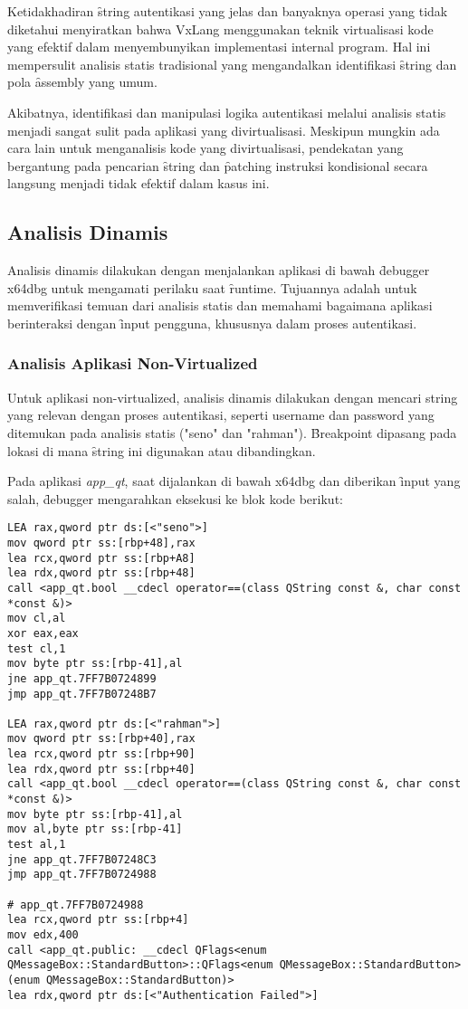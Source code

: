 Ketidakhadiran \f{string} autentikasi yang jelas dan banyaknya operasi yang tidak diketahui menyiratkan bahwa VxLang menggunakan teknik virtualisasi kode yang efektif dalam menyembunyikan implementasi internal program. Hal ini mempersulit analisis statis tradisional yang mengandalkan identifikasi \f{string} dan pola \f{assembly} yang umum.

Akibatnya, identifikasi dan manipulasi logika autentikasi melalui analisis statis menjadi sangat sulit pada aplikasi yang divirtualisasi. Meskipun mungkin ada cara lain untuk menganalisis kode yang divirtualisasi, pendekatan yang bergantung pada pencarian \f{string} dan \f{patching} instruksi kondisional secara langsung menjadi tidak efektif dalam kasus ini.

\subsection{Analisis Dinamis}
Analisis dinamis dilakukan dengan menjalankan aplikasi di bawah \f{debugger} x64dbg untuk mengamati perilaku saat \f{runtime}. Tujuannya adalah untuk memverifikasi temuan dari analisis statis dan memahami bagaimana aplikasi berinteraksi dengan \f{input} pengguna, khususnya dalam proses autentikasi.

\subsubsection{Analisis Aplikasi Non-Virtualized}

Untuk aplikasi non-virtualized, analisis dinamis dilakukan dengan mencari string yang relevan dengan proses autentikasi, seperti username dan password yang ditemukan pada analisis statis ("seno" dan "rahman"). \f{Breakpoint} dipasang pada lokasi di mana \f{string} ini digunakan atau dibandingkan.

Pada aplikasi \textit{app\_qt}, saat dijalankan di bawah x64dbg dan diberikan \f{input} yang salah, \f{debugger} mengarahkan eksekusi ke blok kode berikut:

\begin{verbatim}
LEA rax,qword ptr ds:[<"seno">]
mov qword ptr ss:[rbp+48],rax
lea rcx,qword ptr ss:[rbp+A8]
lea rdx,qword ptr ss:[rbp+48]
call <app_qt.bool __cdecl operator==(class QString const &, char const *const &)>
mov cl,al
xor eax,eax
test cl,1
mov byte ptr ss:[rbp-41],al
jne app_qt.7FF7B0724899
jmp app_qt.7FF7B07248B7

LEA rax,qword ptr ds:[<"rahman">]
mov qword ptr ss:[rbp+40],rax
lea rcx,qword ptr ss:[rbp+90]
lea rdx,qword ptr ss:[rbp+40]
call <app_qt.bool __cdecl operator==(class QString const &, char const *const &)>
mov byte ptr ss:[rbp-41],al
mov al,byte ptr ss:[rbp-41]
test al,1
jne app_qt.7FF7B07248C3
jmp app_qt.7FF7B0724988

# app_qt.7FF7B0724988
lea rcx,qword ptr ss:[rbp+4]
mov edx,400
call <app_qt.public: __cdecl QFlags<enum QMessageBox::StandardButton>::QFlags<enum QMessageBox::StandardButton>(enum QMessageBox::StandardButton)>
lea rdx,qword ptr ds:[<"Authentication Failed">]
\end{verbatim}

